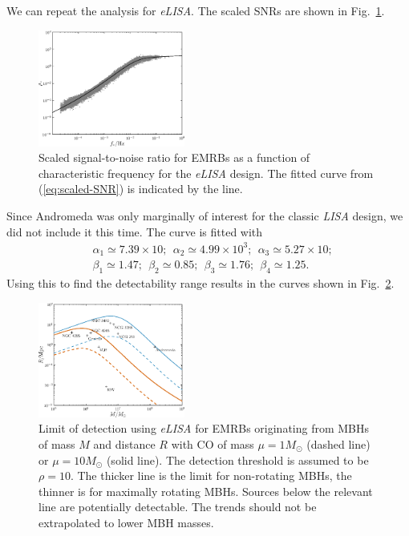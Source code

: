 \documentclass[useAMS,usedcolumn,usegraphicx,usenatbib]{mn2e}
\newcommand{\eqnref}[1]{(\ref{eq:#1})}
\newcommand{\figref}[1]{Fig.~\ref{fig:#1}}
\begin{document}
We can repeat the analysis for \textit{eLISA}. The scaled SNRs are shown in \figref{scaled-SNR-eLISA}.
\begin{figure}
\begin{center}
 \includegraphics[width=0.43\textwidth]{Fig_SNR_scaled_fit_eLISA}
 \caption{Scaled signal-to-noise ratio for EMRBs as a function of characteristic frequency for the \textit{eLISA} design. The fitted curve from \eqnref{scaled-SNR} is indicated by the line.\label{fig:scaled-SNR-eLISA}}
   \end{center}
\end{figure}
Since Andromeda was only marginally of interest for the classic \textit{LISA} design, we did not include it this time. The curve is fitted with
\begin{equation}
\begin{split}
&\alpha_1 \simeq 7.39 \times 10; \ \ \alpha_2 \simeq 4.99 \times 10^3; \ \ \alpha_3 \simeq 5.27 \times 10;\\
&\beta_1 \simeq 1.47; \ \ \beta_2 \simeq 0.85; \ \ \beta_3 \simeq 1.76; \ \ \beta_4 \simeq 1.25.
\end{split}
\end{equation}
Using this to find the detectability range results in the curves shown in \figref{detect-eLISA}.
\begin{figure}
\begin{center}
 \includegraphics[width=0.43\textwidth]{Fig_M_R_detect_2}
 \caption{Limit of detection using \textit{eLISA} for EMRBs originating from MBHs of mass $M$ and distance $R$ with CO of mass $\mu = 1 M_\odot$ (dashed line) or $\mu = 10 M_\odot$ (solid line). The detection threshold is assumed to be $\rho = 10$. The thicker line is the limit for non-rotating MBHs, the thinner is for maximally rotating MBHs. Sources below the relevant line are potentially detectable. The trends should not be extrapolated to lower MBH masses.\label{fig:detect-eLISA}}
   \end{center}
\end{figure}
\end{document}
